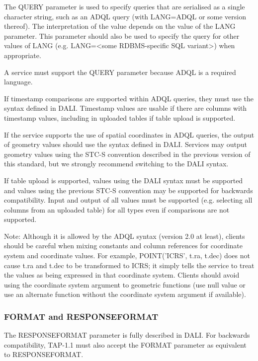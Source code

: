 \documentclass[11pt,letter]{ivoa}
\begin{document}
The QUERY parameter is used to specify queries that are serialised as a single character string, such as an ADQL query (with LANG=ADQL or some version thereof). The  interpretation
of the value depends on the value of the LANG parameter. This parameter should also be used to 
specify the query for other values of LANG (e.g. LANG=<some RDBMS-specific SQL 
variant>) when appropriate.

A service must support the QUERY parameter because ADQL is a required language.

If timestamp comparisons are supported within ADQL queries, they must use the syntax 
defined in DALI. Timestamp values are usable if there are columns with timestamp values, 
including in uploaded tables if table upload is supported.

If the service supports the use of spatial coordinates in ADQL queries, the output of 
geometry values should use the syntax defined in DALI. Services may output geometry values
using the STC-S convention described in the previous version of this standard, but we 
strongly recommend switching to the DALI syntax. 

If table upload is supported, values using the DALI syntax must be supported and values using 
the previous STC-S convention may be supported for backwards compatibility. Input and output of 
all values must be supported (e.g. selecting all columns from an uploaded table) for all types 
even if comparisons are not supported.

Note: Although it is allowed by the ADQL syntax (version 2.0 at least), clients should be careful when 
mixing constants and column references for coordinate system and coordinate 
values. For example, POINT('ICRS', t.ra, t.dec) does not cause t.ra and t.dec to 
be transformed to ICRS; it simply tells the service to treat the values  as 
being expressed in that coordinate system. Clients should avoid using the coordinate 
system argument to geometric functions (use null value or use an 
alternate function without the coordinate system argument if available).

\subsubsection{FORMAT and RESPONSEFORMAT}
\label{sec:RESPONSEFORMAT}

The RESPONSEFORMAT parameter is fully described in DALI. For 
backwards 
compatibility, TAP-1.1 must also accept the FORMAT parameter as equivalent to 
RESPONSEFORMAT.
\end{document}
